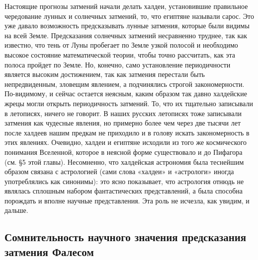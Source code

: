 Настоящие прогнозы затмений начали делать халдеи, установившие
правильное чередование лунных и солнечных затмений, то, что египтяне
называли сарос. Это уже давало возможность предсказывать лунные
затмения, которые были видимы на всей Земле. Предсказания солнечных
затмений несравненно труднее, так как известно, что тень от Луны
пробегает по Земле узкой полосой и необходимо высокое состояние
математической теории, чтобы точно рассчитать, как эта полоса пройдет
по Земле. Но, конечно, само установление периодичности является
высоким достижением, так как затмения перестали быть непредвиденным,
зловещим явлением, а подчинялись строгой закономерности. По-видимому,
и сейчас остается неясным, каким образом так давно халдейские жрецы
могли открыть периодичность затмений. То, что их тщательно записывали
в летописях, ничего не говорит. В наших русских летописях тоже
записывали затмения как чудесные явления, но примерно более чем через
две тысячи лет после халдеев нашим предкам не приходило и в голову
искать закономерность в этих явлениях. Очевидно, халдеи и египтяне
исходили из того же космического понимания Вселенной, которое в
неясной форме существовало и до Пифагора (см. §5 этой главы).
Несомненно, что халдейская астрономия была теснейшим образом связана с
астрологией (сами слова «халдеи» и «астрологи» иногда употреблялись
как синонимы): это ясно показывает, что астрология отнюдь не являлась
сплошным набором фантастических представлений, а была способна
порождать и вполне научные представления. Эта роль не исчезла, как
увидим, и дальше.

\subsection{Сомнительность научного значения предсказания затмения
Фалесом}

